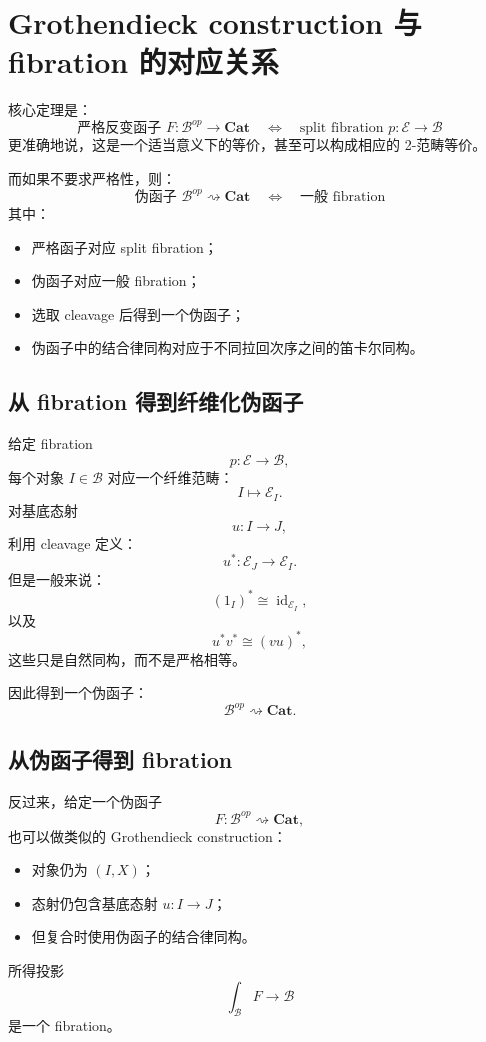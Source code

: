 \documentclass[12pt,a4paper]{article}
\begin{document}
\section{Grothendieck construction 与 fibration 的对应关系}

核心定理是：
\[
\boxed{
\text{严格反变函子 }F:\mathcal{B}^{op}\to\mathbf{Cat}
\quad\Longleftrightarrow\quad
\text{split fibration }p:\mathcal{E}\to\mathcal{B}
}
\]
更准确地说，这是一个适当意义下的等价，甚至可以构成相应的 2-范畴等价。

而如果不要求严格性，则：
\[
\boxed{
\text{伪函子 }\mathcal{B}^{op}\rightsquigarrow\mathbf{Cat}
\quad\Longleftrightarrow\quad
\text{一般 fibration}
}
\]
其中：
\begin{itemize}
  \item 严格函子对应 split fibration；
  \item 伪函子对应一般 fibration；
  \item 选取 cleavage 后得到一个伪函子；
  \item 伪函子中的结合律同构对应于不同拉回次序之间的笛卡尔同构。
\end{itemize}

\subsection{从 fibration 得到纤维化伪函子}

给定 fibration
\[
p:\mathcal{E}\to\mathcal{B},
\]
每个对象 \(I\in\mathcal{B}\) 对应一个纤维范畴：
\[
I\longmapsto\mathcal{E}_I.
\]
对基底态射
\[
u:I\to J,
\]
利用 cleavage 定义：
\[
u^*:\mathcal{E}_J\to\mathcal{E}_I.
\]
但是一般来说：
\[
(1_I)^*\cong \operatorname{id}_{\mathcal{E}_I},
\]
以及
\[
u^*v^*\cong(vu)^*,
\]
这些只是自然同构，而不是严格相等。

因此得到一个伪函子：
\[
\mathcal{B}^{op}\rightsquigarrow\mathbf{Cat}.
\]

\subsection{从伪函子得到 fibration}

反过来，给定一个伪函子
\[
F:\mathcal{B}^{op}\rightsquigarrow\mathbf{Cat},
\]
也可以做类似的 Grothendieck construction：
\begin{itemize}
  \item 对象仍为 \((I,X)\)；
  \item 态射仍包含基底态射 \(u:I\to J\)；
  \item 但复合时使用伪函子的结合律同构。
\end{itemize}
所得投影
\[
\int_{\mathcal{B}}F\to\mathcal{B}
\]
是一个 fibration。
\end{document}
